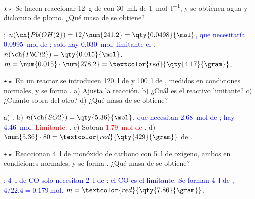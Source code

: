 \begin{exercise}
    \(\star\star\) Se hacen reaccionar \qty{12}{\gram} de  con \qty{30}{\mL} de  \qty{1}{\mol\per\litre}, y se
    obtienen agua y dicloruro de plomo. ¿Qué masa de  se obtiene?
    \begin{solu}
        \textcolor{blue}{; \(n(\ch{Pb(OH)2}) = 12/\num{241.2} = \qty{0.0498}{\mol}\), que necesitaría
        \qty{0.0995}{\mol} de ; solo hay \qty{0.030}{\mol}: limitante el . \(n(\ch{PbCl2}) = \qty{0.015}{\mol}\).}
        \(m = \num{0.015} \cdot \num{278.2} = \textcolor{red}{\qty{4.17}{\gram}}\).
    \end{solu}
\end{exercise}

\begin{exercise}
    \(\star\star\) En un reactor se introducen \qty{120}{\litre} de  y \qty{100}{\litre} de , medidos en condiciones
    normales, y se forma . a) Ajusta la reacción. b) ¿Cuál es el reactivo limitante? c) ¿Cuánto sobra del otro? d) ¿Qué masa
    de  se obtiene?
    \begin{solu}
        a) \textcolor{red}{}. b) \textcolor{blue}{\(n(\ch{SO2}) = \qty{5.36}{\mol}\), que necesitan
        \qty{2.68}{\mol} de ; hay \qty{4.46}{\mol}.} \textcolor{red}{Limitante: }. c) Sobran
        \textcolor{red}{\qty{1.79}{\mol} de }. d) \(\num{5.36} \cdot 80 = \textcolor{red}{\qty{429}{\gram}}\) de .
    \end{solu}
\end{exercise}

\begin{exercise}
    \(\star\star\) Reaccionan \qty{4}{\litre} de monóxido de carbono con \qty{5}{\litre} de oxígeno, ambos en condiciones normales, y
    se forma . ¿Qué masa de  se obtiene?
    \begin{solu}
        \textcolor{blue}{: \qty{4}{\litre} de CO solo necesitan \qty{2}{\litre} de : el CO es el limitante.
        Se forman \qty{4}{\litre} de , \(4/\num{22.4} = \qty{0.179}{\mol}\).} \(m = \textcolor{red}{\qty{7.86}{\gram}}\).
    \end{solu}
\end{exercise}

